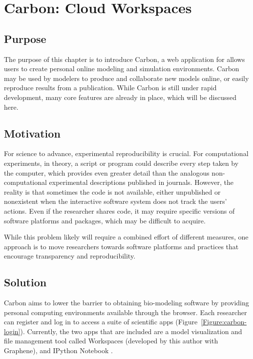 \chapter{Carbon: Cloud Workspaces}
\label{chap:carbon}

\section{Purpose}
The purpose of this chapter is to introduce Carbon, a web application for allows users to create personal online modeling and simulation environments.
Carbon may be used by modelers to produce and collaborate new models online, or easily reproduce results from a publication.
While Carbon is still under rapid development, many core features are already in place, which will be discussed here.

\section{Motivation}

For science to advance, experimental reproducibility is crucial. 
For computational experiments, in theory, a script or program could describe every step taken by the computer, which provides even greater detail than the analogous non-computational experimental descriptions published in journals.
However, the reality is that sometimes the code is not available, either unpublished or nonexistent when the interactive software system does not track the users’ actions.
Even if the researcher shares code, it may require specific versions of software platforms and packages, which may be difficult to acquire.

While this problem likely will require a combined effort of different measures, one approach is to move researchers towards software platforms and practices that encourage transparency and reproducibility.

\section{Solution}

Carbon aims to lower the barrier to obtaining bio-modeling software by providing personal computing environments available through the browser.
Each researcher can register and log in to access a suite of scientific apps (Figure~\ref{Figure:carbon-login}).
Currently, the two apps that are included are a model visualization and file management tool called Workspaces (developed by this author with Graphene), and IPython Notebook \autocite{perez2007ipython}.

